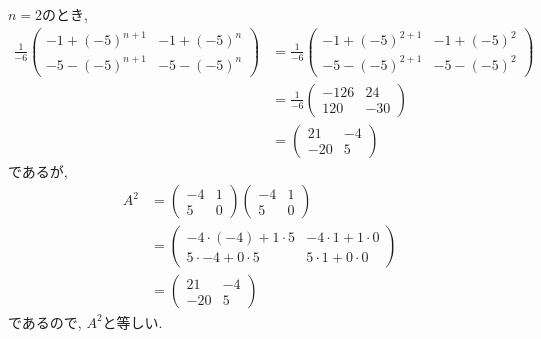 \begin{checkanswer}
  $n=2$のとき,
  \begin{align*}
    \frac{1}{-6}\begin{pmatrix}-1+(-5)^{n+1}&-1+(-5)^n\\-5-(-5)^{n+1}&-5-(-5)^n\end{pmatrix}
    &=\frac{1}{-6}\begin{pmatrix}-1+(-5)^{2+1}&-1+(-5)^2\\-5-(-5)^{2+1}&-5-(-5)^2\end{pmatrix}\\
    &=\frac{1}{-6}\begin{pmatrix}-126&24\\120&-30\end{pmatrix}\\
    &=\begin{pmatrix}21&-4\\-20&5\end{pmatrix}
  \end{align*}
  であるが,
  \begin{align*}
    A^2&=\begin{pmatrix}-4&1\\5&0\end{pmatrix}\begin{pmatrix}-4&1\\5&0\end{pmatrix}\\
      &=\begin{pmatrix}-4\cdot(-4)+1\cdot 5&-4\cdot1+ 1\cdot 0\\5\cdot -4+0\cdot 5&5\cdot 1+0\cdot 0\end{pmatrix}\\
      &=\begin{pmatrix}21&-4\\-20&5\end{pmatrix}
  \end{align*}
  であるので, $A^2$と等しい.
\end{checkanswer}


